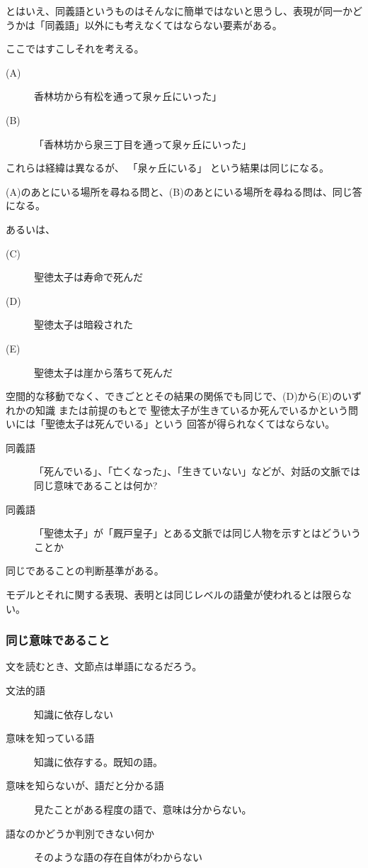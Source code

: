 \documentclass[10pt, oneside]{jarticle}   	%
\begin{document}
とはいえ、同義語というものはそんなに簡単ではないと思うし、表現が同一かどうかは「同義語」以外にも考えなくてはならない要素がある。

ここではすこしそれを考える。

\begin{description}
\item[(A)]香林坊から有松を通って泉ヶ丘にいった」
\item[(B)]「香林坊から泉三丁目を通って泉ヶ丘にいった」
\end{description}
これらは経緯は異なるが、
「泉ヶ丘にいる」
という結果は同じになる。

(A)のあとにいる場所を尋ねる問と、(B)のあとにいる場所を尋ねる問は、同じ答になる。

あるいは、
\begin{description}
\item[ (C)] 聖徳太子は寿命で死んだ
\item[ (D)] 聖徳太子は暗殺された
\item[ (E)] 聖徳太子は崖から落ちて死んだ
\end{description}

空間的な移動でなく、できごととその結果の関係でも同じで、(D)から(E)のいずれかの知識
または前提のもとで
聖徳太子が生きているか死んでいるかという問いには「聖徳太子は死んでいる」という
回答が得られなくてはならない。

\begin{description}
\item[ 同義語] 「死んでいる」、「亡くなった」、「生きていない」などが、対話の文脈では同じ意味であることは何か?
\item[ 同義語] 「聖徳太子」が「厩戸皇子」とある文脈では同じ人物を示すとはどういうことか
\end{description}

同じであることの判断基準がある。

モデルとそれに関する表現、表明とは同じレベルの語彙が使われるとは限らない。

\subsubsection{同じ意味であること}
文を読むとき、文節点は単語になるだろう。

\begin{description}
\item[文法的語 ] 知識に依存しない
\item[意味を知っている語] 知識に依存する。既知の語。
\item[意味を知らないが、語だと分かる語] 見たことがある程度の語で、意味は分からない。 
\item[語なのかどうか判別できない何か] そのような語の存在自体がわからない
\end{description}
\end{document}
